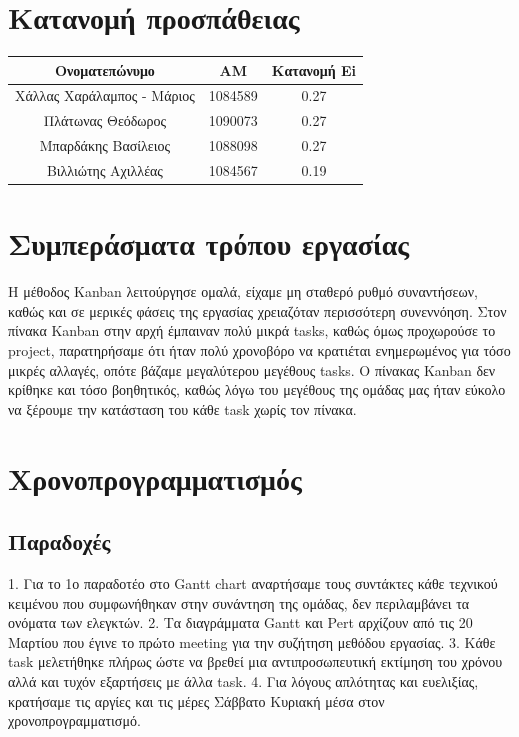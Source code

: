 \documentclass{article}
\begin{document}
\coverpages

\section{Κατανομή προσπάθειας}
\begin{table}[h!]
\centering
\begin{tabular}{|c|c|c|}
\hline
\textbf{Ονοματεπώνυμο} & \textbf{ΑΜ} & \textbf{Κατανομή Ei} \\
\hline
Χάλλας Χαράλαμπος - Μάριος & 1084589 & 0.27 \\
\hline
Πλάτωνας Θεόδωρος & 1090073 &  0.27 \\
\hline
Μπαρδάκης Βασίλειος & 1088098 & 0.27 \\
\hline
Βιλλιώτης Αχιλλέας & 1084567 & 0.19 \\
\hline
\end{tabular}
\label{tab:simple_table}
\end{table}

\section{Συμπεράσματα τρόπου εργασίας}
Η μέθοδος Kanban λειτούργησε ομαλά, είχαμε μη σταθερό ρυθμό συναντήσεων, καθώς και σε μερικές φάσεις της εργασίας χρειαζόταν περισσότερη συνεννόηση. Στον πίνακα Kanban στην αρχή έμπαιναν πολύ μικρά tasks, καθώς όμως προχωρούσε το project, παρατηρήσαμε ότι ήταν πολύ χρονοβόρο να κρατιέται ενημερωμένος για τόσο μικρές αλλαγές, οπότε βάζαμε μεγαλύτερου μεγέθους tasks. Ο πίνακας Kanban δεν κρίθηκε και τόσο βοηθητικός, καθώς λόγω του μεγέθους της ομάδας μας ήταν εύκολο να ξέρουμε την κατάσταση του κάθε task χωρίς τον πίνακα.


\section{Χρονοπρογραμματισμός}
\vspace{20px}
\subsection{Παραδοχές} 
1.	Για το 1ο παραδοτέο στο Gantt chart αναρτήσαμε τους συντάκτες κάθε τεχνικού κειμένου που συμφωνήθηκαν στην συνάντηση της ομάδας, δεν περιλαμβάνει τα ονόματα των ελεγκτών.
2.	Τα διαγράμματα Gantt και Pert αρχίζουν από τις 20 Μαρτίου που έγινε το πρώτο meeting για την συζήτηση μεθόδου εργασίας.
3.	Κάθε task μελετήθηκε πλήρως ώστε να βρεθεί μια αντιπροσωπευτική εκτίμηση του χρόνου αλλά και τυχόν εξαρτήσεις με άλλα task.
4.	Για λόγους απλότητας και ευελιξίας, κρατήσαμε τις αργίες και τις μέρες Σάββατο Κυριακή μέσα στον χρονοπρογραμματισμό.
\vspace{20px}
\end{document}
